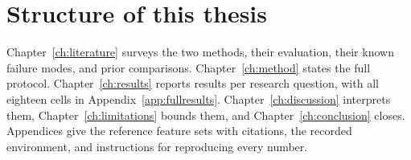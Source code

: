 \section{Structure of this thesis}
Chapter~\ref{ch:literature} surveys the two methods, their evaluation, their known
failure modes, and prior comparisons. Chapter~\ref{ch:method} states the full protocol.
Chapter~\ref{ch:results} reports results per research question, with all eighteen cells
in Appendix~\ref{app:fullresults}. Chapter~\ref{ch:discussion} interprets them,
Chapter~\ref{ch:limitations} bounds them, and Chapter~\ref{ch:conclusion} closes.
Appendices give the reference feature sets with citations, the recorded environment,
and instructions for reproducing every number.
